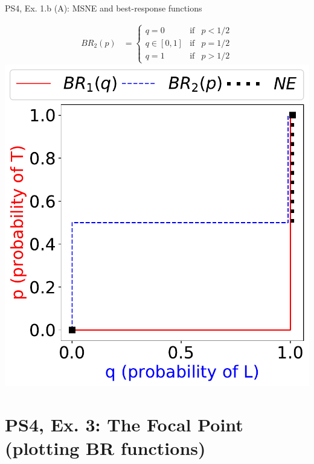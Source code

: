 \begin{frame}{PS4, Ex. 1.b (A): MSNE and best-response functions}
\begin{multicols}{2}
\begin{align*}
      BR_2(p)&=\left\{ \begin{array}{lcl}
          q=0       & \text{if} & p<1/2  \\
          q\in[0,1] & \text{if} & p=1/2 \\
          q=1       & \text{if} & p>1/2
      \end{array}\right.
    \end{align*}
    \vspace{-8pt}
    \includegraphics[width=\columnwidth]{figures/1b}
  \vfill\null
  \end{multicols}
\end{frame}


\section{PS4, Ex. 3: The Focal Point (plotting BR functions)}

